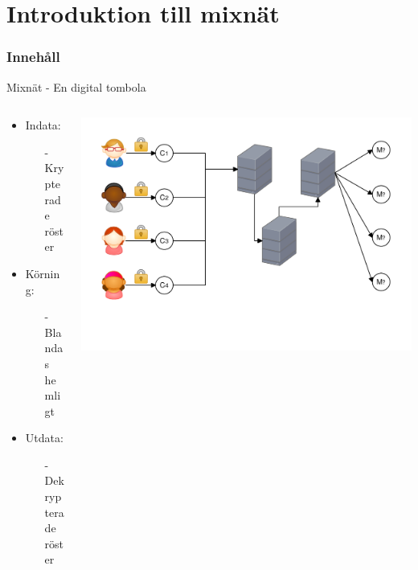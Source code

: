 \section{Introduktion till mixnät}
\begin{frame}
\frametitle{Innehåll}
\tableofcontents[currentsection]
\end{frame}

\begin{frame}{Mixnät - En digital tombola}

\begin{columns}
    \begin{column}{0.4\textwidth}
        \begin{itemize}
			\item Indata:
			\begin{itemize}
				\item[-] Krypterade röster
			\end{itemize}
			\item[]
			\item Körning:
			\begin{itemize}
				\item[-] Blandas hemligt
			\end{itemize}
			\item[]
			\item Utdata:
			\begin{itemize}
				\item[-] Dekrypterade röster
			\end{itemize}
		\end{itemize}
    \end{column}
	\begin{column}{0.6\textwidth}
    	\includegraphics[height=0.7\textwidth]{images/mix1.pdf}
	\end{column}
\end{columns}

\end{frame}